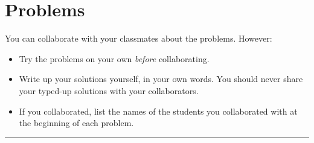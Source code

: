 \documentclass{article}
\begin{document}
\newpage

\section*{Problems}

You can collaborate with your classmates about the problems. However:

\begin{itemize}
  \item Try the problems on your own \textit{before} collaborating.
  \item Write up your solutions yourself, in your own words.  You should never
    share your typed-up solutions with your collaborators.
  \item If you collaborated, list the names of the students you collaborated
    with at the beginning of each problem.
\end{itemize}

\noindent\rule{\linewidth}{1.0pt}
\end{document}
